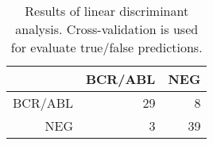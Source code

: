 \begin{table}[ht]
\begin{center}
\begin{tabular}{rrr}
  \hline
 & BCR/ABL & NEG \\ 
  \hline
BCR/ABL &  29 &   8 \\ 
  NEG &   3 &  39 \\ 
   \hline
\end{tabular}
\caption{Results of linear discriminant analysis. Cross-validation is used for evaluate true/false predictions.}
\label{tab:lda}
\end{center}
\end{table}
